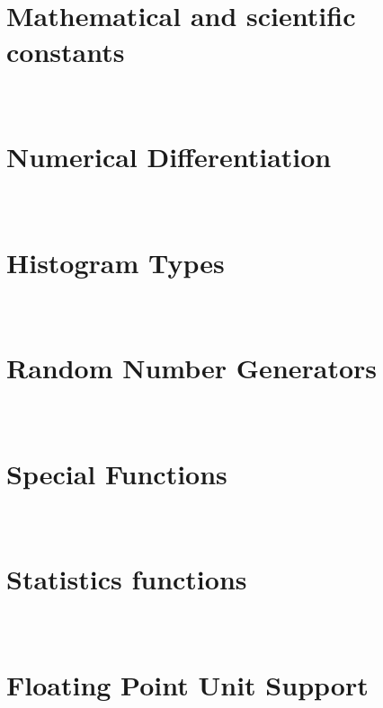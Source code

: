 \documentclass{manual}
\makeatletter
\let\py@OldOldChapter=\chapter
\renewcommand{\chapter}{\py@reset%
                        \py@OldOldChapter}
\makeatother
\begin{document}
\chapter[\protect\module{pygsl.const} --- Mathematical and scientific
constants]{\protect{} \\ Mathematical and scientific
constants} 
\label{cha:const-module}


\chapter[\protect\module{pygsl.diff} --- Numerical 
Differentiation]{\protect{} \\ Numerical Differentiation}
\label{cha:diff-module}


\chapter[\protect\module{pygsl.histogram} --- Histogram Types]
{\protect{} \\ Histogram Types}
\label{cha:histogram-module}


\chapter[\protect\module{pygsl.rng} --- Random Number Generators]
{\protect{} \\ Random Number Generators}
\label{cha:rng-module}


\chapter[\protect\module{pygsl.sf} --- Special Functions]
{\protect{} \\ Special Functions}
\label{cha:sf-module}


\chapter[\protect\module{pygsl.statistics} --- Statistics
functions]{\protect{} \\ Statistics functions}
\label{cha:statistics-module}


\appendix

\chapter[\protect\module{pygsl.ieee} --- Floating Point Unit Support]
{\protect{} \\ Floating Point Unit Support}
\label{cha:ieee-module}

\end{document}
